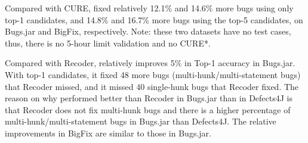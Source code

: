 Compared with CURE, {\tool} fixed relatively 12.1\% and 14.6\% more
bugs using only top-1 candidates, and 14.8\% and 16.7\% more bugs using
the top-5 candidates,
on Bugs.jar and BigFix, respectively. Note: these two datasets have no
test cases, thus, there is no 5-hour limit validation and no CURE*.

Compared with Recoder, {\tool} relatively improves 5\% in Top-1
accuracy in Bugs.jar. With top-1 candidates, it fixed 48 more bugs
(multi-hunk/multi-statement bugs) that Recoder missed, and it missed
40 single-hunk bugs that Recoder fixed. The reason on why {\tool}
performed better than Recoder in Bugs.jar than in Defects4J is that
Recoder does not fix multi-hunk bugs and there is a higher percentage
of multi-hunk/multi-statement bugs in Bugs.jar than Defects4J. The
relative improvements in BigFix are similar to those in Bugs.jar.
